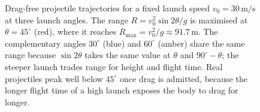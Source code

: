 \begin{figure}[htbp]
\centering
{}
\caption[Projectile trajectories at three launch angles]{Drag-free
projectile trajectories for a fixed launch speed $v_{0}=30\,\si{\meter
\per\second}$ at three launch angles. The range $R=v_{0}^{2}\sin
2\theta/g$ is maximised at $\theta=45^{\circ}$ (red), where it reaches
$R_{\max}=v_{0}^{2}/g\approx 91.7\,\si{\meter}$. The complementary
angles $30^{\circ}$ (blue) and $60^{\circ}$ (amber) share the same
range because $\sin 2\theta$ takes the same value at $\theta$ and
$90^{\circ}-\theta$; the steeper launch trades range for height and
flight time. Real projectiles peak well below $45^{\circ}$ once drag
is admitted, because the longer flight time of a high launch exposes
the body to drag for longer.}
\label{fig:vol03ch04:projectile-angles}
\end{figure}
